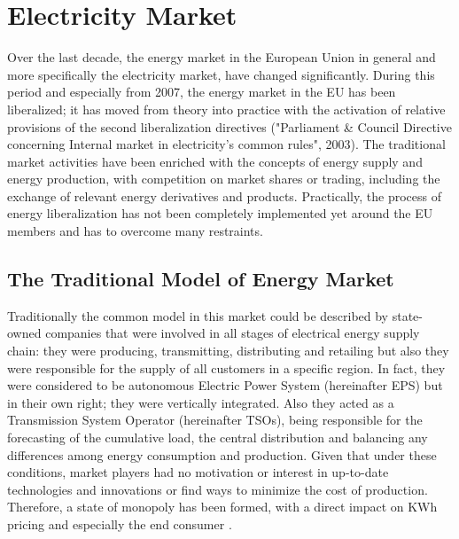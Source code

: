 \chapter{Electricity Market}
\par Over the last decade, the energy market in the European Union in general and more specifically the electricity market, have changed significantly. During this period and especially from 2007, the energy market in the EU has been liberalized; it has moved from theory into practice with the activation of relative provisions of the second liberalization directives ("Parliament \& Council Directive concerning Internal market in electricity's common rules", 2003). The traditional market activities have been enriched with the concepts of energy supply and energy production, with competition on market shares or trading, including the exchange of relevant energy derivatives and products. Practically, the process of energy liberalization has not been completely implemented yet around the EU members and has to overcome many restraints.    
\section{The Traditional Model of Energy Market}
Traditionally the common model in this market could be described by state-owned companies that were involved in all stages of electrical energy supply chain: they were producing, transmitting, distributing and retailing but also they were responsible for the supply of all customers in a specific region. In fact, they were considered to be autonomous Electric Power System (hereinafter EPS) but in their own right; they were vertically integrated. Also they acted as a Transmission System Operator (hereinafter TSOs), being responsible for the forecasting of the cumulative load, the central distribution and balancing any differences among energy consumption and production. Given that under these conditions, market players had no motivation or interest in up-to-date technologies and innovations or find ways to minimize the cost of production. Therefore, a state of monopoly has been formed, with a direct impact on KWh pricing and especially the end consumer \cite{ecom}.  
